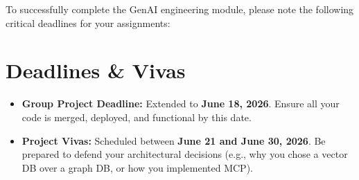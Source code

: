 \documentclass[12pt,a4paper,oneside]{book}
\begin{document}
To successfully complete the GenAI engineering module, please note the following critical deadlines for your assignments:

\section{Deadlines \& Vivas}
\begin{itemize}
	\item \textbf{Group Project Deadline:} Extended to \textbf{June 18, 2026}. Ensure all your code is merged, deployed, and functional by this date.
	\item \textbf{Project Vivas:} Scheduled between \textbf{June 21 and June 30, 2026}. Be prepared to defend your architectural decisions (e.g., why you chose a vector DB over a graph DB, or how you implemented MCP).
\end{itemize}
\end{document}
